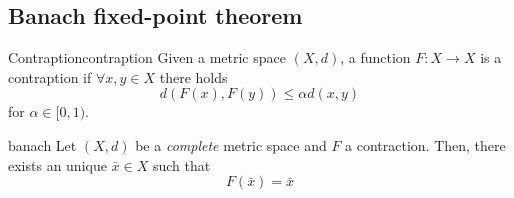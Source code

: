 \documentclass[12pt]{extarticle}
\numberwithin{equation}{section}
\begin{document}
\subsection{Banach fixed-point theorem}

\begin{definition}{Contraption}{contraption}
  Given a metric space $(X, d)$, a function $F: X \to X$ is a contraption if
  $\forall x, y \in X$ there holds
  \begin{equation}
    d(F(x), F(y)) \leq \alpha d(x, y)
  \end{equation}
  for $\alpha \in [0, 1)$.
\end{definition}

\begin{theorem}{}{banach}
    Let $(X, d)$ be a \emph{complete} metric space and $F$ a contraction.
    Then, there exists an unique $\bar x \in X$ such that
    \begin{equation}
        F(\bar x) = \bar x
    \end{equation}
\end{theorem}
\end{document}
